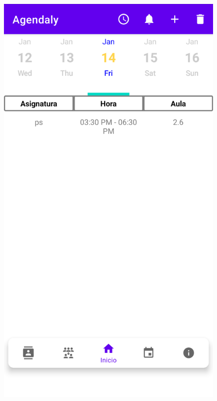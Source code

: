 \documentclass[a4paper,openright,12pt]{article}
\begin{document}
\begin{figure}
        \includegraphics[scale=0.05]{notificacion1.png} 

\end{figure}
\end{document}
